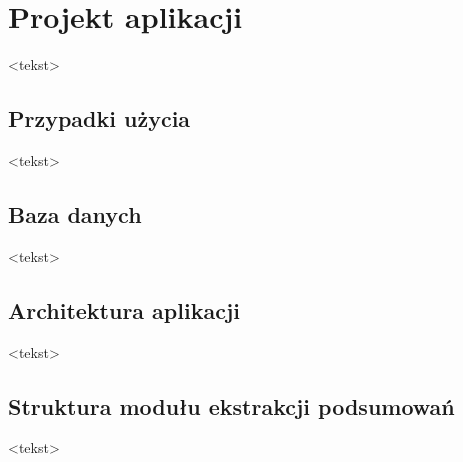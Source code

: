 \chapter{Projekt aplikacji}

<tekst>


\section{Przypadki użycia}

<tekst>


\section{Baza danych}

<tekst>


\section{Architektura aplikacji}

<tekst>


\section{Struktura modułu ekstrakcji podsumowań}

<tekst>

